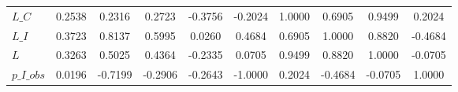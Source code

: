 \begin{center}
\begin{longtable}{lccccccccc}
$L\_C            $	 & 	            0.2538	 & 	            0.2316	 & 	            0.2723	 & 	           -0.3756	 & 	           -0.2024	 & 	            1.0000	 & 	            0.6905	 & 	            0.9499	 & 	            0.2024 \\ 
$L\_I            $	 & 	            0.3723	 & 	            0.8137	 & 	            0.5995	 & 	            0.0260	 & 	            0.4684	 & 	            0.6905	 & 	            1.0000	 & 	            0.8820	 & 	           -0.4684 \\ 
$L               $	 & 	            0.3263	 & 	            0.5025	 & 	            0.4364	 & 	           -0.2335	 & 	            0.0705	 & 	            0.9499	 & 	            0.8820	 & 	            1.0000	 & 	           -0.0705 \\ 
$p\_I\_obs       $	 & 	            0.0196	 & 	           -0.7199	 & 	           -0.2906	 & 	           -0.2643	 & 	           -1.0000	 & 	            0.2024	 & 	           -0.4684	 & 	           -0.0705	 & 	            1.0000 \\ 
\end{longtable}
 \end{center}
